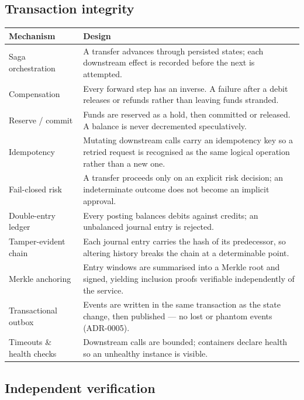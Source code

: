 \documentclass[11pt,a4paper]{article}
\begin{document}
\subsection{Transaction integrity}

\begin{center}
\begin{tabularx}{\textwidth}{@{}lX@{}}
\toprule
\textbf{Mechanism} & \textbf{Design}\\
\midrule
Saga orchestration & A transfer advances through persisted states; each downstream effect is recorded before the next is attempted.\\
Compensation & Every forward step has an inverse. A failure after a debit releases or refunds rather than leaving funds stranded.\\
Reserve / commit & Funds are reserved as a hold, then committed or released. A balance is never decremented speculatively.\\
Idempotency & Mutating downstream calls carry an idempotency key so a retried request is recognised as the same logical operation rather than a new one.\\
Fail-closed risk & A transfer proceeds only on an explicit risk decision; an indeterminate outcome does not become an implicit approval.\\
Double-entry ledger & Every posting balances debits against credits; an unbalanced journal entry is rejected.\\
Tamper-evident chain & Each journal entry carries the hash of its predecessor, so altering history breaks the chain at a determinable point.\\
Merkle anchoring & Entry windows are summarised into a Merkle root and signed, yielding inclusion proofs verifiable independently of the service.\\
Transactional outbox & Events are written in the same transaction as the state change, then published --- no lost or phantom events (ADR-0005).\\
Timeouts \& health checks & Downstream calls are bounded; containers declare health so an unhealthy instance is visible.\\
\bottomrule
\end{tabularx}
\end{center}

\subsection{Independent verification}
\end{document}

